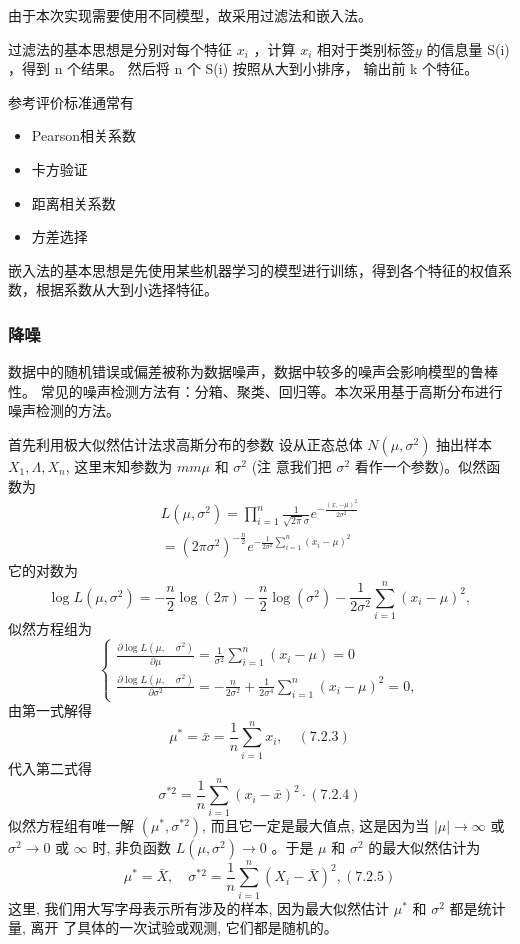 \documentclass[12pt, a4paper, oneside]{ctexart}
\begin{document}
由于本次实现需要使用不同模型，故采用过滤法和嵌入法。

过滤法的基本思想是分别对每个特征
$ x_i$ ，计算 $x_i$ 相对于类别标签$ y $
的信息量 S(i) ，得到 n 个结果。
然后将 n 个 S(i) 按照从大到小排序，
输出前 k 个特征。

参考评价标准通常有
\begin{itemize}
    \item Pearson相关系数
    \item 卡方验证
    \item 距离相关系数
    \item 方差选择
\end{itemize}

嵌入法的基本思想是先使用某些机器学习的模型进行训练，得到各个特征的权值系数，根据系数从大到小选择特征。

\subsubsection{降噪}
数据中的随机错误或偏差被称为数据噪声，数据中较多的噪声会影响模型的鲁棒性。
常见的噪声检测方法有：分箱、聚类、回归等。本次采用基于高斯分布进行噪声检测的方法。

首先利用极大似然估计法求高斯分布的参数
设从正态总体 $N\left(\mu, \sigma^2\right)$ 抽出样本 $X_1, \Lambda, X_n$, 这里末知参数为 $m m \mu$ 和 $\sigma^2$ (注 意我们把 $\sigma^2$ 看作一个参数)。似然函数为
$$
\begin{gathered}
L\left(\mu, \sigma^2\right)=\prod_{i=1}^n \frac{1}{\sqrt{2 \pi} \sigma} e^{-\frac{(x,-\mu)^2}{2 \sigma^2}} \\
=\left(2 \pi \sigma^2\right)^{-\frac{n}{2}} e^{-\frac{1}{2 \sigma^2} \sum_{i=1}^n\left(x_i-\mu\right)^2}
\end{gathered}
$$
它的对数为
$$
\log L\left(\mu, \sigma^2\right)=-\frac{n}{2} \log (2 \pi)-\frac{n}{2} \log \left(\sigma^2\right)-\frac{1}{2 \sigma^2} \sum_{i=1}^n\left(x_i-\mu\right)^2,
$$
似然方程组为
$$
\left\{\begin{array}{l}
\frac{\partial \log L\left(\mu, \quad \sigma^2\right)}{\partial \mu}=\frac{1}{\sigma^2} \sum_{i=1}^n\left(x_i-\mu\right)=0 \\
\frac{\partial \log L\left(\mu, \quad \sigma^2\right)}{\partial \sigma^2}=-\frac{n}{2 \sigma^2}+\frac{1}{2 \sigma^4} \sum_{i=1}^n\left(x_i-\mu\right)^2=0,
\end{array}\right.
$$
由第一式解得
$$
\mu^*=\bar{x}=\frac{1}{n} \sum_{i=1}^n x_i, \quad(7.2 .3)
$$
代入第二式得
$$
\sigma^{*2}=\frac{1}{n} \sum_{i=1}^n\left(x_i-\bar{x}\right)^2 \cdot(7.2 .4)
$$
似然方程组有唯一解 $\left(\mu^*, \sigma^{*2}\right)$, 而且它一定是最大值点, 这是因为当 $|\mu| \rightarrow \infty$ 或 $\sigma^2 \rightarrow 0$ 或 $\infty$ 时, 非负函数 $L\left(\mu, \sigma^2\right) \rightarrow 0$ 。于是 $\mu$ 和 $\sigma^2$ 的最大似然估计为
$$
\mu^{*}=\bar{X}, \quad \sigma^{*2}=\frac{1}{n} \sum_{i=1}^n\left(X_i-\bar{X}\right)^2,(7.2 .5)
$$
这里, 我们用大写字母表示所有涉及的样本, 因为最大似然估计 $\mu^*$ 和 $\sigma^2$ 都是统计量, 离开 
了具体的一次试验或观测, 它们都是随机的。
\end{document}

